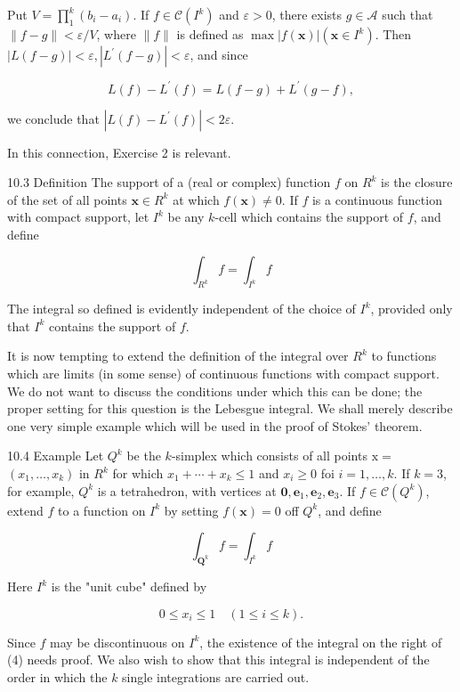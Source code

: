 \documentclass[10pt]{article}
\begin{document}
Put $V=\prod_{1}^{k}\left(b_{i}-a_{i}\right)$. If $f \in \mathscr{C}\left(I^{k}\right)$ and $\varepsilon>0$, there exists $g \in \mathscr{A}$ such that $\|f-g\|<\varepsilon / V$, where $\|f\|$ is defined as $\max |f(\mathbf{x})|\left(\mathbf{x} \in I^{k}\right)$. Then $|L(f-g)|<\varepsilon,\left|L^{\prime}(f-g)\right|<\varepsilon$, and since

$$
L(f)-L^{\prime}(f)=L(f-g)+L^{\prime}(g-f),
$$

we conclude that $\left|L(f)-L^{\prime}(f)\right|<2 \varepsilon$.

In this connection, Exercise 2 is relevant.

10.3 Definition The support of a (real or complex) function $f$ on $R^{k}$ is the closure of the set of all points $\mathbf{x} \in R^{k}$ at which $f(\mathbf{x}) \neq 0$. If $f$ is a continuous function with compact support, let $I^{k}$ be any $k$-cell which contains the support of $f$, and define

$$
\int_{R^{k}} f=\int_{I^{k}} f
$$

The integral so defined is evidently independent of the choice of $I^{k}$, provided only that $I^{k}$ contains the support of $f$.

It is now tempting to extend the definition of the integral over $R^{k}$ to functions which are limits (in some sense) of continuous functions with compact support. We do not want to discuss the conditions under which this can be done; the proper setting for this question is the Lebesgue integral. We shall merely describe one very simple example which will be used in the proof of Stokes' theorem.

10.4 Example Let $Q^{k}$ be the $k$-simplex which consists of all points $\mathrm{x}=$ $\left(x_{1}, \ldots, x_{k}\right)$ in $R^{k}$ for which $x_{1}+\cdots+x_{k} \leq 1$ and $x_{i} \geq 0$ foi $i=1, \ldots, k$. If $k=3$, for example, $Q^{k}$ is a tetrahedron, with vertices at $\mathbf{0}, \mathbf{e}_{1}, \mathbf{e}_{2}, \mathbf{e}_{3}$. If $f \in \mathscr{C}\left(Q^{k}\right)$, extend $f$ to a function on $I^{k}$ by setting $f(\mathbf{x})=0$ off $Q^{k}$, and define

$$
\int_{\mathbf{Q}^{k}} f=\int_{I^{k}} f
$$

Here $I^{k}$ is the "unit cube" defined by

$$
0 \leq x_{i} \leq 1 \quad(1 \leq i \leq k) .
$$

Since $f$ may be discontinuous on $I^{k}$, the existence of the integral on the right of (4) needs proof. We also wish to show that this integral is independent of the order in which the $k$ single integrations are carried out.
\end{document}
